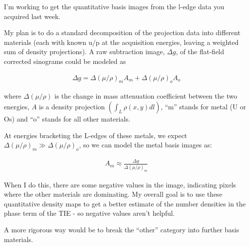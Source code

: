 \documentclass[aps]{article}
\begin{document}
I'm working to get the quantitative basis images from the l-edge data you acquired last week.\newline

My plan is to do a standard decomposition of the projection data into different materials (each with known u/p at the acquisition energies, leaving a weighted sum of density projections). A raw subtraction image, $\Delta g$, of the flat-field corrected sinograms could be modeled as

\begin{align}
  \Delta g = \Delta(\mu/\rho)_{m}A_{m} + \Delta(\mu/\rho)_{o}A_{o}
\end{align}

\noindent where $\Delta(\mu/\rho)$ is the change in mass attenuation coefficient between the two energies, $A$ is a density projection $\left(\int_L \rho(x,y) dl\right)$, ``m'' stands for metal (U or Os) and ``o'' stands for all other materials.

At energies bracketing the L-edges of these metals, we expect $\Delta(\mu/\rho)_m \gg \Delta(\mu/\rho)_o$, so we can model the metal basis images as:

\begin{align}
  A_m \approx \frac{\Delta g}{\Delta (\mu/\rho)_m}
\end{align}

When I do this, there are some negative values in the image, indicating pixels where the other materials are dominating. My overall goal is to use these quantitative density maps to get a better estimate of the number densities in the phase term of the TIE - so negative values aren't helpful.

A more rigorous way would be to break the ``other'' category into further basis materials. 





\end{document}
